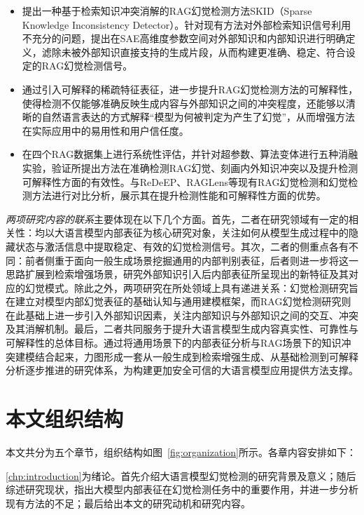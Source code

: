 \begin{itemize}
    \item 提出一种基于检索知识冲突消解的RAG幻觉检测方法SKID（Sparse Knowledge Inconsistency Detector）。针对现有方法对外部检索知识信号利用不充分的问题，提出在SAE高维度参数空间对外部知识和内部知识进行明确定义，滤除未被外部知识直接支持的生成片段，从而构建更准确、稳定、符合设定的RAG幻觉检测信号。
    \item 通过引入可解释的稀疏特征表征，进一步提升RAG幻觉检测方法的可解释性，使得检测不仅能够准确反映生成内容与外部知识之间的冲突程度，还能够以清晰的自然语言表达的方式解释“模型为何被判定为产生了幻觉”，从而增强方法在实际应用中的易用性和用户信任度。
    \item 在四个RAG数据集上进行系统性评估，并针对超参数、算法变体进行五种消融实验，验证所提出方法在准确检测RAG幻觉、刻画内外知识冲突以及提升检测可解释性方面的有效性。与ReDeEP、RAGLens等现有RAG幻觉检测和幻觉检测方法进行对比分析，展示其在提升检测性能和可解释性方面的优势。
\end{itemize}

\emph{两项研究内容的联系}主要体现在以下几个方面。首先，二者在研究领域有一定的相关性：均以大语言模型内部表征为核心研究对象，关注如何从模型生成过程中的隐藏状态与激活信息中提取稳定、有效的幻觉检测信号。其次，二者的侧重点各有不同：前者侧重于面向一般生成场景挖掘通用的内部判别表征，后者则进一步将这一思路扩展到检索增强场景，研究外部知识引入后内部表征所呈现出的新特征及其对应的幻觉模式。除此之外，两项研究在所处领域上具有递进关系：幻觉检测研究旨在建立对模型内部幻觉表征的基础认知与通用建模框架，而RAG幻觉检测研究则在此基础上进一步引入外部知识因素，关注内部知识与外部知识之间的交互、冲突及其消解机制。最后，二者共同服务于提升大语言模型生成内容真实性、可靠性与可解释性的总体目标。通过将通用场景下的内部表征分析与RAG场景下的知识冲突建模结合起来，力图形成一套从一般生成到检索增强生成、从基础检测到可解释分析逐步推进的研究体系，为构建更加安全可信的大语言模型应用提供方法支撑。

\section{本文组织结构}\label{sec:organization}

本文共分为五个章节，组织结构如图~\ref{fig:organization}所示。各章内容安排如下：

\ref{chp:introduction}为绪论。首先介绍大语言模型幻觉检测的研究背景及意义；随后综述研究现状，指出大模型内部表征在幻觉检测任务中的重要作用，并进一步分析现有方法的不足；最后给出本文的研究动机和研究内容。

